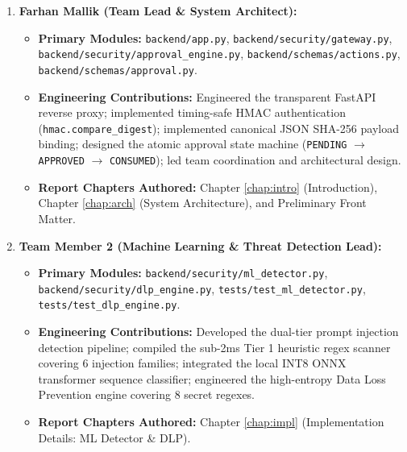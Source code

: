 \begin{enumerate}
    \item \textbf{Farhan Mallik (Team Lead \& System Architect):}
    \begin{itemize}
        \item \textbf{Primary Modules:} \texttt{backend/app.py}, \texttt{backend/security/gateway.py}, \texttt{backend/security/approval\_engine.py}, \texttt{backend/schemas/actions.py}, \texttt{backend/schemas/approval.py}.
        \item \textbf{Engineering Contributions:} Engineered the transparent FastAPI reverse proxy; implemented timing-safe HMAC authentication (\texttt{hmac.compare\_digest}); implemented canonical JSON SHA-256 payload binding; designed the atomic approval state machine (\texttt{PENDING} $\to$ \texttt{APPROVED} $\to$ \texttt{CONSUMED}); led team coordination and architectural design.
        \item \textbf{Report Chapters Authored:} Chapter \ref{chap:intro} (Introduction), Chapter \ref{chap:arch} (System Architecture), and Preliminary Front Matter.
    \end{itemize}

    \item \textbf{Team Member 2 (Machine Learning \& Threat Detection Lead):}
    \begin{itemize}
        \item \textbf{Primary Modules:} \texttt{backend/security/ml\_detector.py}, \texttt{backend/security/dlp\_engine.py}, \texttt{tests/test\_ml\_detector.py}, \texttt{tests/test\_dlp\_engine.py}.
        \item \textbf{Engineering Contributions:} Developed the dual-tier prompt injection detection pipeline; compiled the sub-2ms Tier 1 heuristic regex scanner covering 6 injection families; integrated the local INT8 ONNX transformer sequence classifier; engineered the high-entropy Data Loss Prevention engine covering 8 secret regexes.
        \item \textbf{Report Chapters Authored:} Chapter \ref{chap:impl} (Implementation Details: ML Detector \& DLP).
    \end{itemize}


\end{enumerate}
